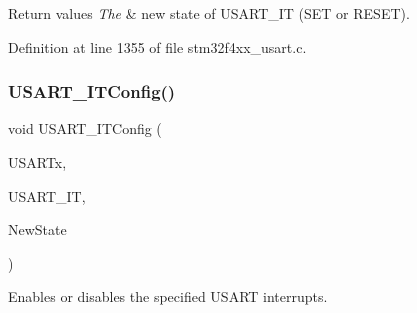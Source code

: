\begin{DoxyRetVals}{Return values}
{\em The} & new state of U\+S\+A\+R\+T\+\_\+\+IT (S\+ET or R\+E\+S\+ET). \\
\hline
\end{DoxyRetVals}


Definition at line 1355 of file stm32f4xx\+\_\+usart.\+c.

\mbox{\label{group___u_s_a_r_t___group9_ga6d8f2dd1f34060ae7e386e3e5d56b6f6}} 
\subsubsection{\texorpdfstring{U\+S\+A\+R\+T\+\_\+\+I\+T\+Config()}{USART\_ITConfig()}}
{\footnotesize\ttfamily void U\+S\+A\+R\+T\+\_\+\+I\+T\+Config (\begin{DoxyParamCaption}\item[{\hyperlink{struct_u_s_a_r_t___type_def}{U\+S\+A\+R\+T\+\_\+\+Type\+Def} $\ast$}]{U\+S\+A\+R\+Tx,  }\item[{uint16\+\_\+t}]{U\+S\+A\+R\+T\+\_\+\+IT,  }\item[{Functional\+State}]{New\+State }\end{DoxyParamCaption})}



Enables or disables the specified U\+S\+A\+RT interrupts. 


